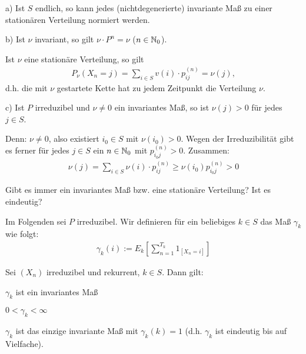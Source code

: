 \documentclass[a4paper,twoside,DIV15,BCOR12mm]{scrbook}
\begin{document}
\begin{bemerkung}
  a) Ist $S$ endlich, so kann jedes (nichtdegenerierte) invariante Maß zu einer stationären Verteilung normiert werden.

  b) Ist $\nu$ invariant, so gilt $\nu \cdot P^n = \nu$ ($n \in \mathbb{N}_0$).

  Ist $\nu$ eine stationäre Verteilung, so gilt
  \begin{align*}
    P_\nu(X_n = j) = \sum_{i \in S} v(i) \cdot p_{ij}^{(n)} = \nu(j),
  \end{align*}
  d.h. die mit $\nu$ gestartete Kette hat zu jedem Zeitpunkt die Verteilung $\nu$.

  c) Ist $P$ irreduzibel und $\nu \neq 0$ ein invariantes Maß, so ist $\nu(j) > 0$ für jedes $j\in S$.

  Denn: $\nu \neq 0$, also existiert $i_0 \in S$ mit $\nu(i_0) > 0$.
  Wegen der Irreduzibilität gibt es ferner für jedes $j \in S$ ein $n \in \mathbb{N}_0$ mit $p_{i_0j}^{(n)} > 0$. Zusammen:
  \begin{align*}
    \nu(j) = \sum_{i \in S} \nu(i) \cdot p_{ij}^{(n)} \geq \nu(i_0) p_{i_0j}^{(n)} > 0
  \end{align*}
\end{bemerkung}


Gibt es immer ein invariantes Maß bzw. eine stationäre Verteilung? Ist es eindeutig?

Im Folgenden sei $P$ irreduzibel. Wir definieren für ein beliebiges $k \in S$ das Maß $\gamma_k$ wie folgt:
\begin{align*}
  \gamma_k(i) := E_k[\sum_{n=1}^{T_k} 1_{[X_n = i]}]
\end{align*}


\begin{satz}
\label{satz3.1}
  Sei $(X_n)$ irreduzibel und rekurrent, $k \in S$. Dann gilt:
  \begin{enuma}
  \item $\gamma_k$ ist ein invariantes Maß
  \item $0 < \gamma_k < \infty$
  \item $\gamma_k$ ist das einzige invariante Maß mit $\gamma_k(k) = 1$ (d.h. $\gamma_k$ ist eindeutig bis auf Vielfache).
  \end{enuma}
\end{satz}
\end{document}

